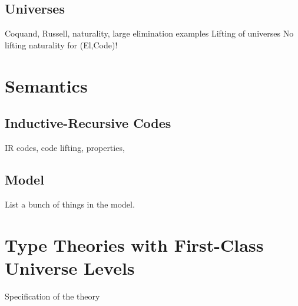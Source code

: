 \documentclass[a4paper,UKenglish,cleveref, autoref, thm-restate]{lipics-v2021}
\theoremstyle{remark}
\newtheorem{notation}{Notation}
\theoremstyle{definition}
\newcommand{\Ty}{\mathsf{Ty}}
\newcommand{\up}{\uparrow}
\newcommand{\down}{\downarrow}
\newcommand{\Lift}{\mathsf{Lift}}
\begin{document}





\subsection{Universes}
\label{sec:universes}

Coquand, Russell, naturality, large elimination examples
Lifting of universes
No lifting naturality for (El,Code)!

\section{Semantics}
\label{sec:semantics}

\subsection{Inductive-Recursive Codes}
\label{sec:inductive_recursive_codes}

IR codes, code lifting, properties,

\subsection{Model}

List a bunch of things in the model.

\section{Type Theories with First-Class Universe Levels}
\label{sec:ttfl}

Specification of the theory






\end{document}
